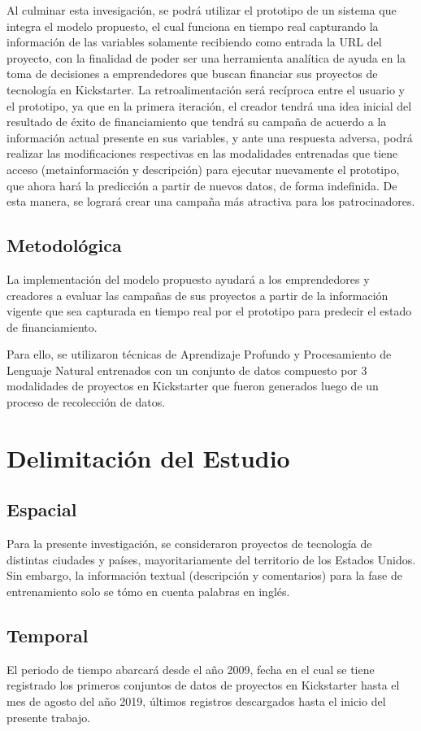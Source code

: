 Al culminar esta invesigación, se podrá utilizar el prototipo de un sistema que integra el modelo propuesto, el cual funciona en tiempo real capturando la información de las variables solamente recibiendo como entrada la URL del proyecto, con la finalidad de poder ser una herramienta analítica de ayuda en la toma de decisiones a emprendedores que buscan financiar sus proyectos de tecnología en Kickstarter. La retroalimentación será recíproca entre el usuario y el prototipo, ya que en la primera iteración, el creador tendrá una idea inicial del resultado de éxito de financiamiento que tendrá su campaña de acuerdo a la información actual presente en sus variables, y ante una respuesta adversa, podrá realizar las modificaciones respectivas en las modalidades entrenadas que tiene acceso (metainformación y descripción) para ejecutar nuevamente el prototipo, que ahora hará la predicción a partir de nuevos datos, de forma indefinida. De esta manera, se logrará crear una campaña más atractiva para los patrocinadores.

\subsection{Metodológica}
La implementación del modelo propuesto ayudará a los emprendedores y creadores a evaluar las campañas de sus proyectos a partir de la información vigente que sea capturada en tiempo real por el prototipo para predecir el estado de financiamiento.

Para ello, se utilizaron técnicas de Aprendizaje Profundo y Procesamiento de Lenguaje Natural entrenados con un conjunto de datos compuesto por 3 modalidades de proyectos en Kickstarter que fueron generados luego de un proceso de recolección de datos.

\section{Delimitación del Estudio}

\subsection{Espacial}
Para la presente investigación, se consideraron proyectos de tecnología de distintas ciudades y países, mayoritariamente del territorio de los Estados Unidos. Sin embargo, la información textual (descripción y comentarios) para la fase de entrenamiento solo se tómo en cuenta palabras en inglés.

\subsection{Temporal}
El periodo de tiempo abarcará desde el año 2009, fecha en el cual se tiene registrado los primeros conjuntos de datos de proyectos en Kickstarter hasta el mes de agosto del año 2019, últimos registros descargados hasta el inicio del presente trabajo.

